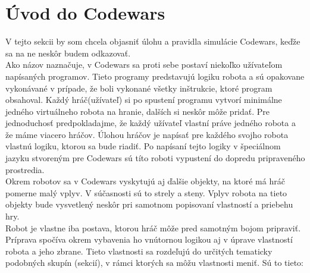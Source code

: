 \section{Úvod do Codewars}
V tejto sekcii by som chcela objasniť úlohu a pravidla simulácie Codewars, keďže sa na ne neskôr budem odkazovať. \\ 
Ako názov naznačuje, v Codewars sa proti sebe postaví niekoľko užívateľom napísaných programov. Tieto programy predstavujú logiku robota a sú opakovane vykonávané v prípade, že boli vykonané všetky inštrukcie, ktoré program obsahoval. Každý hráč(užívateľ) si po spustení programu vytvorí minimálne jedného virtuálneho robota na hranie, dalších si neskôr môže pridať. Pre jednoduchosť predpokladajme, že každý užívateľ vlastní práve jedného robota a že máme viacero hráčov. Úlohou hráčov je napísať pre každého svojho robota vlastnú logiku, ktorou sa bude riadiť. Po napísaní tejto logiky v špeciálnom jazyku stvoreným pre Codewars sú títo roboti vypustení do dopredu pripraveného prostredia. \\
\indent Okrem robotov sa v Codewars vyskytujú aj ďalšie objekty, na ktoré má hráč pomerne malý vplyv. V súčasnosti sú to strely a steny. Vplyv robota na tieto objekty bude vysvetlený neskôr pri samotnom popisovaní vlastností a priebehu hry. \\%
\indent Robot je vlastne iba postava, ktorou hráč môže pred samotným bojom pripraviť. Príprava spočíva okrem vybavenia ho vnútornou logikou aj v úprave vlastností robota a jeho zbrane. Tieto vlastnosti sa rozdeľujú do určitých tematicky podobných skupín (sekcií), v rámci ktorých sa môžu vlastnosti meniť. Sú to tieto:
